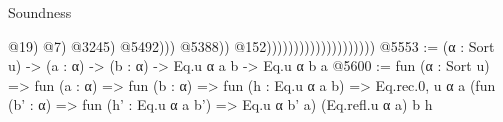 \begin{lexlean}{Soundness}
\begin{coremodule}
                                                                              @19)
                                                                            @7)
                                                                          @3245)
                                                                        @5492)))
                                                              @5388))
                                                        @152))))))))))))))))))))
@5553 := (α : Sort u) -> (a : α) -> (b : α) -> Eq.{u} α a b -> Eq.{u} α b a
@5600 := fun (α : Sort u) =>
  fun (a : α) =>
  fun (b : α) =>
  fun (h : Eq.{u} α a b) =>
  Eq.rec.{0, u}
    α
    a
    (fun (b' : α) => fun (h' : Eq.{u} α a b') => Eq.{u} α b' a)
    (Eq.refl.{u} α a)
    b
    h
\end{coremodule}
\end{lexlean}
